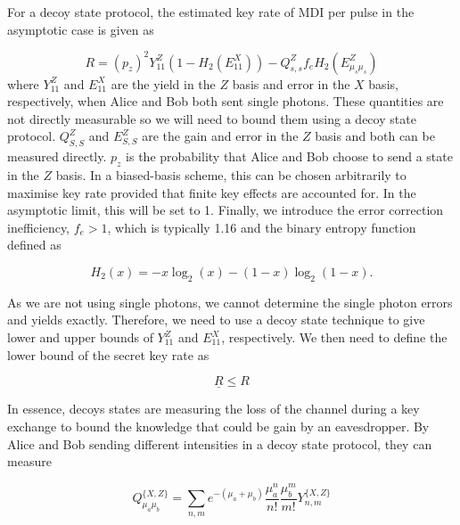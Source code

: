 For a decoy state protocol, the estimated key rate of \ac{MDI} per pulse in the asymptotic case is given as \cite{Lo2014}

\begin{equation}
	R = (p_z)^2 Y_{11}^Z \left(1 - H_2(E_{11}^X)\right) - Q_{s,s}^Z f_e H_2(E_{\mu_s\mu_s}^Z)
\end{equation}
where $Y_{11}^Z$ and $E_{11}^X$ are the yield in the $Z$ basis and error in the $X$ basis, respectively, when Alice and Bob both sent single photons. These quantities are not directly measurable so we will need to bound them using a decoy state protocol. $Q_{S,S}^Z$ and $E_{S,S}^Z$ are the gain and error in the $Z$ basis and both can be measured directly. $p_z$  is the probability that Alice and Bob choose to send a state in the $Z$ basis. In a biased-basis scheme, this can be chosen arbitrarily to maximise key rate provided that finite key effects are accounted for. In the asymptotic limit, this will be set to 1. Finally, we introduce the error correction inefficiency, $f_e>1$, which is typically 1.16 and the binary entropy function defined as

\begin{equation}
	H_2(x) = -x \log_2(x) - (1-x) \log_2(1-x).
\end{equation}


As we are not using single photons, we cannot determine the single photon errors and yields exactly. Therefore, we need to use a decoy state technique \cite{Lo2005} to give lower and upper bounds of $Y_{11}^Z$ and $E_{11}^X$, respectively. We then need to define the lower bound of the secret key rate as

\begin{equation}
	\underline{R} \leq R
\end{equation}

In essence, decoys states are measuring the loss of the channel during a key exchange to bound the knowledge that could be gain by an eavesdropper.  By Alice and Bob sending different intensities in a decoy state protocol, they can measure

\begin{equation}
	\label{eq:gain1}
	Q^{\{X, Z\}}_{\mu_a \mu_b} = \sum_{n,m} e^{-(\mu_a + \mu_b)}\frac{\mu_a^n}{n!}\frac{\mu_b^m}{m!} Y_{n,m}^{\{X, Z\}}
\end{equation}

